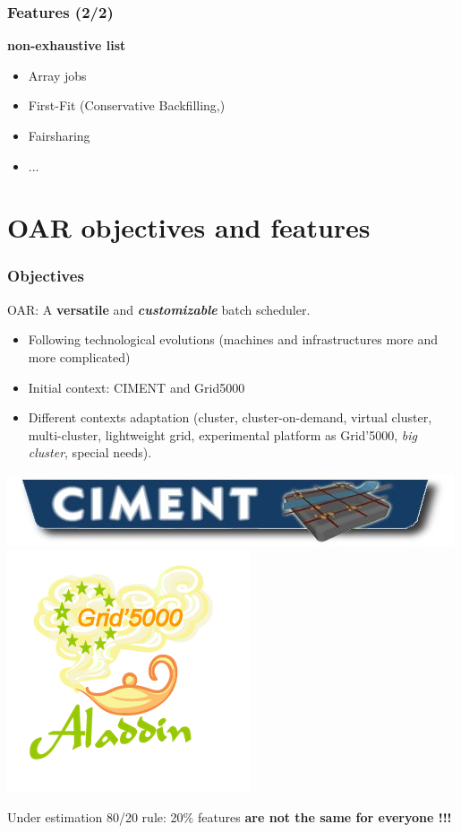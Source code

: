 \documentclass{beamer}
\begin{document}
\begin{frame}
\frametitle{Features (2/2)}
	{\bf non-exhaustive list}
		\begin{itemize}
    \item Array jobs
		\item First-Fit (Conservative Backfilling,)
		\item Fairsharing
    \item ... 
		
	\end{itemize}
\end{frame}


\section{OAR objectives and features}


\begin{frame}
	\frametitle{Objectives} \hypertarget{objectifs}{}

	OAR: A {\bf versatile} and {\bf {\em customizable}} batch scheduler.

	\begin{itemize}
		\item Following technological evolutions (machines and infrastructures more and more complicated)
		\item Initial context: CIMENT \hyperlink{ciment-appendix}{ }  and Grid5000 \hyperlink{g5k-appendix}{ }
                \item Different contexts adaptation (cluster, cluster-on-demand, virtual cluster, multi-cluster, lightweight grid, experimental platform as Grid'5000, {\em big cluster}, special needs). 
	\end{itemize}

\begin{center}
        \hspace{1ex}
        \includegraphics[height=2ex]{img/ciment-logo2.jpg}
        \hspace{1ex}
        \includegraphics[height=7ex]{img/Logo_Aladdin.png}
\end{center}

\begin{alertblock}{Under estimation}
   80/20 rule: 20\% features {\bf are not the same for everyone !!!}  
\end{alertblock}

\end{frame}
\end{document}
